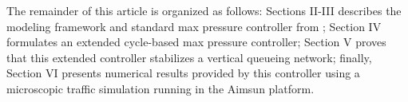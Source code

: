 
The remainder of this article is organized as follows: Sections II-III describes the modeling framework and standard max pressure controller from \cite{Varaiya2013}; Section IV formulates an extended cycle-based max pressure controller; Section V proves that this extended controller stabilizes a vertical queueing network; finally, Section VI presents numerical results provided by this controller using a microscopic traffic simulation running in the Aimsun platform. %


%
%






